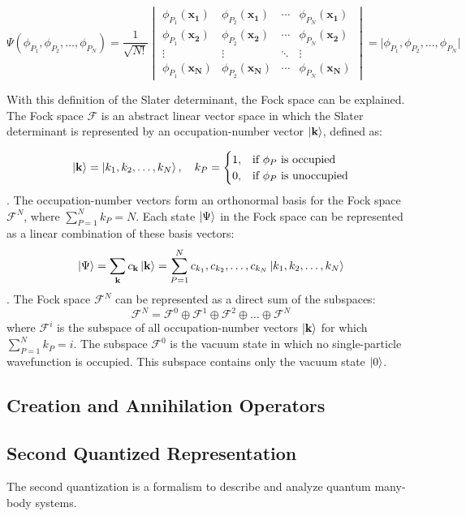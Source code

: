 \begin{equation}
    \Psi(\phi_{P_1}, \phi_{P_2},..., \phi_{P_N}) = \frac{1}{\sqrt{N!}}
    \begin{vmatrix}
        \phi_{P_1}(\mathbf{x_1}) & \phi_{P_2}(\mathbf{x_1}) & \cdots & \phi_{P_N}(\mathbf{x_1}) \\
        \phi_{P_1}(\mathbf{x_2}) & \phi_{P_2}(\mathbf{x_2}) & \cdots & \phi_{P_N}(\mathbf{x_2}) \\
        \vdots & \vdots & \ddots & \vdots \\
        \phi_{P_1}(\mathbf{x_N}) & \phi_{P_2}(\mathbf{x_N}) & \cdots & \phi_{P_N}(\mathbf{x_N})
    \end{vmatrix} = \lvert \phi_{P_1}, \phi_{P_2},..., \phi_{P_N} \rvert 
\end{equation}

With this definition of the Slater determinant, the Fock space can be explained. The Fock space $\mathcal{F}$ is an abstract linear vector space in which the Slater determinant is represented by an occupation-number vector $\ket{\textbf{k}}$, defined as:

\begin{equation}
    \ket{\mathbf{k}} = \ket{k_1, k_2, \ldots, k_N}, \quad k_P = 
    \begin{cases}
        1, & \text{if $\phi_P$ is occupied} \\
        0, & \text{if $\phi_P$ is unoccupied} 
    \end{cases}
\end{equation}
\cite{Helgaker2000}. The occupation-number vectors form an orthonormal basis for the Fock space $\mathcal{F}^N$, where $\sum_{P=1}^{N} k_P = N$. Each state $\ket{\Psi}$ in the Fock space can be represented as a linear combination of these basis vectors:
\begin{equation}
    \ket{\Psi} = \sum_{\mathbf{k}} c_{\mathbf{k}} \ket{\mathbf{k}} = \sum_{P = 1}^N c_{k_1}, c_{k_2},\ldots, c_{k_N} \ket{k_1, k_2, \ldots, k_N}
\end{equation}
\cite{Altland}.
The Fock space $\mathcal{F}^N$ can be represented as a direct sum of the subspaces: 
\begin{equation}
    \mathcal{F}^N = \mathcal{F}^0 \oplus \mathcal{F}^1 \oplus \mathcal{F}^2 \oplus \ldots \oplus \mathcal{F}^N
\end{equation}
where $\mathcal{F}^i$ is the subspace of all occupation-number vectors $\ket{\mathbf{k}}$ for which $\sum_{P=1}^{N} k_P = i$. The subspace $\mathcal{F}^0$ is the vacuum state in which no single-particle wavefunction is occupied. This subspace contains only the vacuum state $\ket{0}$.

\subsection{Creation and Annihilation Operators}
\subsection{Second Quantized Representation}




The second quantization is a formalism to describe and analyze quantum many-body systems. \cite{Altland}
